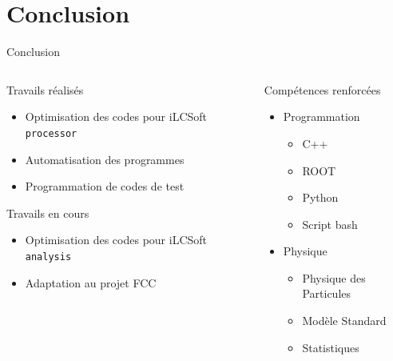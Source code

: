 \documentclass[9pt]{beamer}
\begin{document}
\section{Conclusion}

\begin{frame}{Conclusion}

\begin{columns}

	\begin{column}{0.45\textwidth}
		\begin{exampleblock}{Travails réalisés}
			\begin{itemize}
		 		\item Optimisation des codes pour iLCSoft \texttt{processor}
		 		\item Automatisation des programmes
		 		\item Programmation de codes de test
			\end{itemize}
		\end{exampleblock}
        \begin{alertblock}{Travails en cours}
			\begin{itemize}
		 		\item Optimisation des codes pour iLCSoft \texttt{analysis}
		 		\item Adaptation au projet FCC
			\end{itemize}
		\end{alertblock}
	\end{column}
	
	\begin{column}{0.45\textwidth}
		\begin{block}{Compétences renforcées}
			\begin{itemize}
                \item Programmation
                \begin{itemize}
                    \item C++
                    \item ROOT
                    \item Python
                    \item Script bash
                \end{itemize}
                
                \item Physique
                \begin{itemize}
                    \item Physique des Particules
                    \item Modèle Standard
                    \item Statistiques
                \end{itemize}
            

\end{itemize}
\end{block}
\end{column}
\end{columns}
\end{frame}
\end{document}
